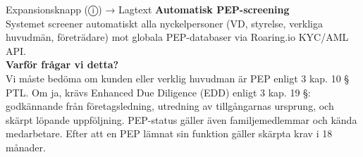 \documentclass[10pt]{beamer}
\begin{document}
\begin{frame}[label=riskfragor-steg1]
\begin{alertblock}{Expansionsknapp (ⓘ) → Lagtext}
    \tiny \textbf{Automatisk PEP-screening}\\
    \tiny Systemet screener automatiskt alla nyckelpersoner (VD, styrelse, verkliga huvudmän, företrädare) mot globala PEP-databaser via Roaring.io KYC/AML API.\\[0.1cm]
    
    \tiny \textbf{Varför frågar vi detta?}\\
    \tiny Vi måste bedöma om kunden eller verklig huvudman är PEP enligt 3 kap. 10 § PTL. Om ja, krävs Enhanced Due Diligence (EDD) enligt 3 kap. 19 §: godkännande från företagsledning, utredning av tillgångarnas ursprung, och skärpt löpande uppföljning. PEP-status gäller även familjemedlemmar och kända medarbetare. Efter att en PEP lämnat sin funktion gäller skärpta krav i 18 månader.
  \end{alertblock}

  \vspace{0.4cm}
  \begin{flushright}
    \hyperlink{riskfragor-steg2}{} \hspace{0.3cm} 
  \end{flushright}
\end{frame}



\end{document}
